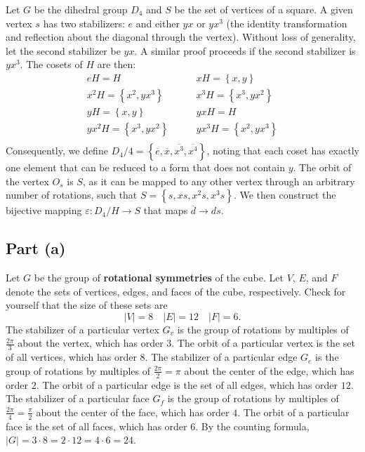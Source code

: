 \documentclass{article}
\begin{document}
\newpage

Let $G$ be the dihedral group $D_4$ and $S$ be the set of vertices of a square. A given vertex $s$ has two stabilizers: $e$ and either $yx$ or $yx^3$ (the identity transformation and reflection about the diagonal through the vertex). Without loss of generality, let the second stabilizer be $yx$. A similar proof proceeds if the second stabilizer is $yx^3$. The cosets of $H$ are then:
\begin{equation}
    \begin{split}
        eH = H \quad & \quad xH = \left\{x, y\right\} \\
        x^2H = \left\{x^2, yx^3\right\} \quad & \quad x^3H = \left\{x^3, yx^2\right\} \\
        yH = \left\{x, y\right\} \quad & \quad yxH = H \\
        yx^2H = \left\{x^3, yx^2\right\} \quad & \quad yx^3H = \left\{x^2, yx^3\right\} \\
    \end{split}
\end{equation}
Consequently, we define $D_4 / 4 = \left\{\overline{e}, \overline{x}, \overline{x^3}, \overline{x^4}\right\}$, noting that each coset has exactly one element that can be reduced to a form that does not contain $y$. The orbit of the vertex $O_s$ is $S$, as it can be mapped to any other vertex through an arbitrary number of rotations,  such that $S = \left\{s, xs, x^2s, x^3s\right\}$. We then construct the bijective mapping $\varepsilon : D_4 / H \to S$ that maps $\overline{d} \to ds$.

\newpage

\subsection*{Part (a)}
Let $G$ be the group of \textbf{rotational symmetries} of the cube. Let $V$, $E$, and $F$ denote the sets of vertices, edges, and faces of the cube, respectively. Check for yourself that the size of these sets are 
\begin{equation}
    |V| = 8 \quad |E| = 12 \quad |F| = 6.
\end{equation}
The stabilizer of a particular vertex $G_v$ is the group of rotations by multiples of $\frac{2\pi}{3}$ about the vertex, which has order $3$. The orbit of a particular vertex is the set of all vertices, which has order $8$. The stabilizer of a particular edge $G_e$ is the group of rotations by multiples of $\frac{2\pi}{2} = \pi$ about the center of the edge, which has order $2$. The orbit of a particular edge is the set of all edges, which has order $12$. The stabilizer of a particular face $G_f$ is the group of rotations by multiples of $\frac{2\pi}{4} = \frac{\pi}{2}$ about the center of the face, which has order $4$. The orbit of a particular face is the set of all faces, which has order $6$. By the counting formula, $|G| = 3 \cdot 8 = 2 \cdot 12 = 4 \cdot 6 = 24$.
\end{document}
